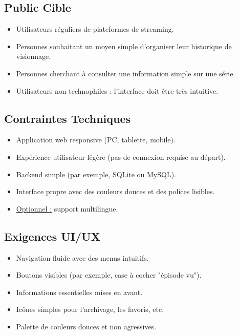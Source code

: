 \subsection{Public Cible}
\begin{itemize}
    \item Utilisateurs réguliers de plateformes de streaming.
    \item Personnes souhaitant un moyen simple d'organiser leur historique de visionnage.
    \item Personnes cherchant à consulter une information simple sur une série.
    \item Utilisateurs non technophiles : l'interface doit être très intuitive.
\end{itemize}

\subsection{Contraintes Techniques}
\begin{itemize}
    \item Application web responsive (PC, tablette, mobile).
    \item Expérience utilisateur légère (pas de connexion requise au départ).
    \item Backend simple (par exemple, SQLite ou MySQL).
    \item Interface propre avec des couleurs douces et des polices lisibles.
    \item \underline{Optionnel :} support multilingue.
\end{itemize}

\subsection{Exigences UI/UX}
\begin{itemize}
    \item Navigation fluide avec des menus intuitifs.
    \item Boutons visibles (par exemple, case à cocher "épisode vu").
    \item Informations essentielles mises en avant.
    \item Icônes simples pour l'archivage, les favoris, etc.
    \item Palette de couleurs douces et non agressives.
\end{itemize}

